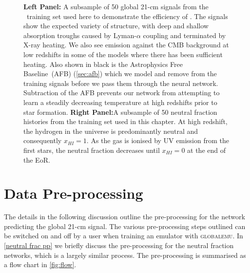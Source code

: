 \begin{figure}
    \caption{\textbf{Left Panel:} A subsample of 50 global 21-cm signals from the \cmGEM~training set used here to demonstrate the efficiency of \name. The signals show the expected variety of structure, with deep and shallow absorption troughs caused by Lyman-$\alpha$ coupling and terminated by X-ray heating. We also see emission against the CMB background at low redshifts in some of the models where there has been sufficient heating. Also shown in black is the Astrophysics Free Baseline~(AFB) (\cref{sec:afb}) which we model and remove from the training signals before we pass them through the neural network. Subtraction of the AFB prevents our network from attempting to learn a steadily decreasing temperature at high redshifts prior to star formation. \textbf{Right Panel:}A subsample of 50 neutral fraction histories from the training set used in this chapter. At high redshift, the hydrogen in the universe is predominantly neutral and consequently $x_{HI}=1$. As the gas is ionised by UV emission from the first stars, the neutral fraction decreases until $x_{HI}=0$ at the end of the EoR.}
    \label{fig:example_signals}
\end{figure}

\section{Data Pre-processing}
\label{sec:preprocessing}

The details in the following discussion outline the pre-processing for the network predicting the global 21-cm signal. The various pre-processing steps outlined can be switched on and off by a user when training an emulator with \textsc{globalemu}. In \cref{neutral frac pp} we briefly discuss the pre-processing for the neutral fraction networks, which is a largely similar process. The pre-processing is summarised as a flow chart in \cref{fig:flow}.

